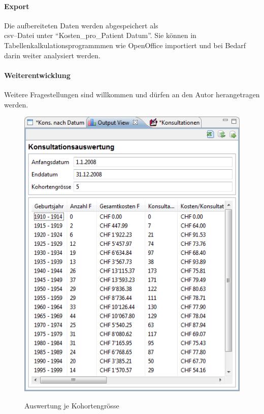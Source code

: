 \documentclass[smallheadings,headsepline,12pt,a4paper,pagenumber=false]{scrartcl}
\begin{document}
\paragraph{Export} Die aufbereiteten Daten werden abgespeichert als\\
 csv--Datei unter  ``Kosten\_pro\_Patient Datum''. Sie können in Tabellenkalkulationsprogrammmen wie OpenOffice importiert und bei Bedarf darin weiter analysiert werden.
\paragraph{Weiterentwicklung} Weitere Fragestellungen sind willkommen und dürfen an den Autor herangetragen werden.

\begin{figure}
  \includegraphics{kohorte}\\
  \caption{Auswertung je Kohortengrösse}\label{Abb1}
\end{figure}
\end{document}
